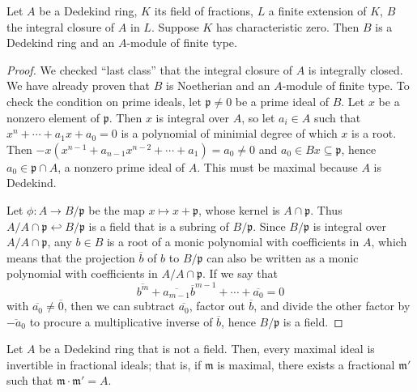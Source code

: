 \documentclass[10pt]{scrartcl}
\providecommand{\ol}{\overline}
\providecommand{\mf}[1]{\mathfrak{#1}}
\begin{document}
\begin{theorem}
	Let $A$ be a Dedekind ring, $K$ its field of fractions,
	$L$ a finite extension of $K$, $B$ the integral closure of $A$ in $L$.
	Suppose $K$ has characteristic zero. Then $B$ is a Dedekind ring
	and an $A$-module of finite type.
\end{theorem}

\begin{proof}
	We checked ``last class'' that the integral closure of $A$
	is integrally closed. We have already proven that $B$ is Noetherian
	and an $A$-module of finite type. To check the condition on prime ideals,
	let $\mathfrak p\ne 0$ be a prime ideal of $B$. Let $x$ be
	a nonzero element of $\mathfrak p$. Then $x$ is integral over $A$,
	so let $a_i\in A$ such that $x^n + \cdots + a_1x + a_0 = 0$
	is a polynomial of minimial degree of which $x$ is a root.
	Then $-x(x^{n-1} + a_{n-1}x^{n-2} + \cdots + a_1) = a_0\ne 0$
	and $a_0\in Bx\subseteq\mathfrak p$, hence $a_0\in\mathfrak p\cap A$,
	a nonzero prime ideal of $A$. This must be maximal because $A$ is Dedekind.
	
	Let $\phi\colon A\to B/\mathfrak p$ be the map $x\mapsto x+\mathfrak p$,
	whose kernel is $A\cap\mathfrak p$.
	Thus $A/A\cap\mathfrak p\hookleftarrow B/\mathfrak p$ is a field
	that is a subring of $B/\mathfrak p$. Since $B/\mathfrak p$ is integral
	over $A/A\cap\mathfrak p$, any $b\in B$ is a root
	of a monic polynomial with coefficients in $A$, which means that
	the projection $\ol b$ of $b$ to $B/\mathfrak p$ can also be written as
	a monic polynomial with coefficients in $A/A\cap\mathfrak p$.
	If we say that
	\[\ol {b^m} + \ol {a_{m-1}}{\ol b^{m-1}} + \cdots + \ol {a_0} = 0\]
	with $\ol{a_0}\ne\ol 0$, then we can subtract $\ol{a_0}$,
	factor out $\ol b$, and divide the other factor by $\ol{-a_0}$
	to procure a multiplicative inverse of $\ol b$, hence $B/\mathfrak p$
	is a field.
\end{proof}

\begin{theorem}
	Let $A$ be a Dedekind ring that is not a field.
	Then, every maximal ideal is invertible in fractional ideals;
	that is, if $\mathfrak m$ is maximal, there exists
	a fractional $\mathfrak m'$ such that $\mathfrak m\cdot\mf m' = A$.
\end{theorem}
\end{document}

